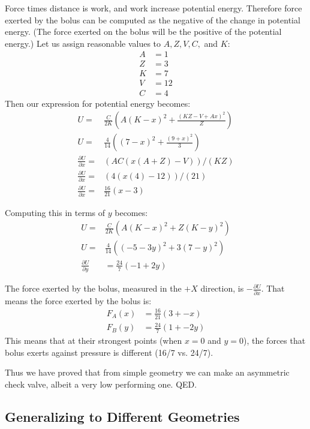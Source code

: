 \documentclass{asme2ej}
\begin{document}
Force times distance is work, and work increase potential energy.
Therefore force exerted by the bolus can be computed as the negative of the change in potential energy.
(The force exerted on the bolus will be the positive of the potential energy.)
Let us assign reasonable values to $A,Z,V,C,$ and $K$:
\begin{align}
  A &= 1 \\
  Z &= 3 \\
  K &= 7 \\
  V &= 12 \\
  C &= 4
\end{align}
Then our expression for potential energy becomes:
\begin{align}
  U = &\frac{C}{2K} \left( A  (K - x)^2 + \frac{(K Z - V + A x)^2}{Z} \right) \\
  U = &\frac{4}{14} \left(   (7 - x)^2 + \frac{(9 +  x)^2}{3} \right) \\
  \frac{\partial U}{\partial x} = &(A C (x (A + Z) - V))/(K Z) \\
  \frac{\partial U}{\partial x} = & (4 (x (4) - 12))/(21) \\
  \frac{\partial U}{\partial x} = & \frac{16}{21} (x - 3)
\end{align}

Computing this in terms of $y$ becomes:
\begin{align}
  U = & \frac{C}{2K} \left( A  (K - x)^2 + Z (K - y)^2 \right) \\
  U = & \frac{4}{14} \left(   (-5 - 3y)^2 + 3 (7 - y)^2 \right) \\
  \frac{\partial U}{\partial y} &= \frac{24}{7} (-1 + 2 y)
  \end{align}


The force exerted by the bolus, measured in the $+X$ direction, is $-\frac{\partial U}{\partial x}$.
That means the force exerted by the bolus is:
\begin{align}
  F_A(x) &= \frac{16}{21} (3 + -x) \\
  F_B(y) &= \frac{24}{7} (1 + -2 y)
\end{align}
This means that at their strongest points (when $x = 0$ and $y =0$), the
forces that bolus exerts against pressure is different (16/7 vs. 24/7).

Thus we have proved that from simple geometry we can make an asymmetric
check valve, albeit a very low performing one.
QED.

\subsection{Generalizing to Different Geometries}
\end{document}

